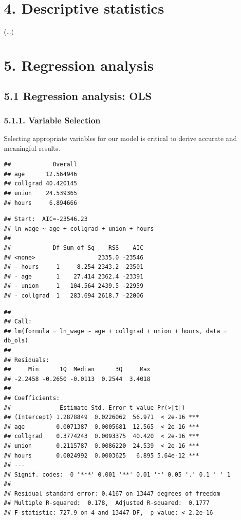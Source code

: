\documentclass[
]{article}
\begin{document}
\hypertarget{descriptive-statistics}{%
\section{4. Descriptive statistics}\label{descriptive-statistics}}

(\ldots)

\hypertarget{regression-analysis}{%
\section{5. Regression analysis}\label{regression-analysis}}

\hypertarget{regression-analysis-ols}{%
\subsection{5.1 Regression analysis:
OLS}\label{regression-analysis-ols}}

\hypertarget{variable-selection}{%
\subsubsection{5.1.1. Variable Selection}\label{variable-selection}}

Selecting appropriate variables for our model is critical to derive
accurate and meaningful results.

\begin{verbatim}
##            Overall
## age      12.564946
## collgrad 40.420145
## union    24.539365
## hours     6.894666
\end{verbatim}

\begin{verbatim}
## Start:  AIC=-23546.23
## ln_wage ~ age + collgrad + union + hours
## 
##            Df Sum of Sq    RSS    AIC
## <none>                  2335.0 -23546
## - hours     1     8.254 2343.2 -23501
## - age       1    27.414 2362.4 -23391
## - union     1   104.564 2439.5 -22959
## - collgrad  1   283.694 2618.7 -22006
\end{verbatim}

\begin{verbatim}
## 
## Call:
## lm(formula = ln_wage ~ age + collgrad + union + hours, data = db_ols)
## 
## Residuals:
##     Min      1Q  Median      3Q     Max 
## -2.2458 -0.2650 -0.0113  0.2544  3.4018 
## 
## Coefficients:
##              Estimate Std. Error t value Pr(>|t|)    
## (Intercept) 1.2878849  0.0226062  56.971  < 2e-16 ***
## age         0.0071387  0.0005681  12.565  < 2e-16 ***
## collgrad    0.3774243  0.0093375  40.420  < 2e-16 ***
## union       0.2115787  0.0086220  24.539  < 2e-16 ***
## hours       0.0024992  0.0003625   6.895 5.64e-12 ***
## ---
## Signif. codes:  0 '***' 0.001 '**' 0.01 '*' 0.05 '.' 0.1 ' ' 1
## 
## Residual standard error: 0.4167 on 13447 degrees of freedom
## Multiple R-squared:  0.178,  Adjusted R-squared:  0.1777 
## F-statistic: 727.9 on 4 and 13447 DF,  p-value: < 2.2e-16
\end{verbatim}
\end{document}
